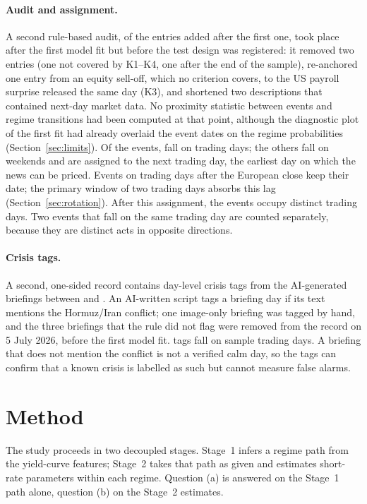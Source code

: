 \documentclass[11pt,a4paper]{article}
\begin{document}
\paragraph{Audit and assignment.} A second rule-based audit, of the entries added after the first one, took place after the first model fit but before the test design was registered: it removed two entries (one not covered by K1--K4, one after the end of the sample), re-anchored one entry from an equity sell-off, which no criterion covers, to the US payroll surprise released the same day (K3), and shortened two descriptions that contained next-day market data. No proximity statistic between events and regime transitions had been computed at that point, although the diagnostic plot of the first fit had already overlaid the event dates on the regime probabilities (Section~\ref{sec:limits}). Of the \NEvents{} events, \NEventsTD{} fall on trading days; the others fall on weekends and are assigned to the next trading day, the earliest day on which the news can be priced. Events on trading days after the European close keep their date; the primary window of two trading days absorbs this lag (Section~\ref{sec:rotation}). After this assignment, the \NEvents{} events occupy \NEventDays{} distinct trading days. Two events that fall on the same trading day are counted separately, because they are distinct acts in opposite directions.

\paragraph{Crisis tags.} A second, one-sided record contains \NTags{} day-level crisis tags from the AI-generated briefings between \TagStart{} and \TagEnd{}. An AI-written script tags a briefing day if its text mentions the Hormuz/Iran conflict; one image-only briefing was tagged by hand, and the three briefings that the rule did not flag were removed from the record on 5 July 2026, before the first model fit. \NTagsTD{} tags fall on sample trading days. A briefing that does not mention the conflict is not a verified calm day, so the tags can confirm that a known crisis is labelled as such but cannot measure false alarms.

\section{Method}\label{sec:method}

The study proceeds in two decoupled stages. Stage~1 infers a regime path from the yield-curve features; Stage~2 takes that path as given and estimates short-rate parameters within each regime. Question (a) is answered on the Stage~1 path alone, question (b) on the Stage~2 estimates.
\end{document}
